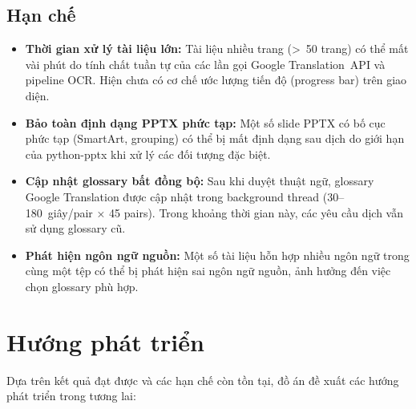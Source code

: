 \subsection{Hạn chế}

\begin{itemize}
  \item \textbf{Thời gian xử lý tài liệu lớn:} Tài liệu nhiều trang (>~50 trang) có thể mất
    vài phút do tính chất tuần tự của các lần gọi Google Translation~API và pipeline OCR.
    Hiện chưa có cơ chế ước lượng tiến độ (progress bar) trên giao diện.

  \item \textbf{Bảo toàn định dạng PPTX phức tạp:} Một số slide PPTX có bố cục phức tạp
    (SmartArt, grouping) có thể bị mất định dạng sau dịch do giới hạn của python-pptx khi
    xử lý các đối tượng đặc biệt.

  \item \textbf{Cập nhật glossary bất đồng bộ:} Sau khi duyệt thuật ngữ, glossary Google
    Translation được cập nhật trong background thread (30--180~giây/pair × 45 pairs). Trong
    khoảng thời gian này, các yêu cầu dịch vẫn sử dụng glossary cũ.

  \item \textbf{Phát hiện ngôn ngữ nguồn:} Một số tài liệu hỗn hợp nhiều ngôn ngữ trong cùng
    một tệp có thể bị phát hiện sai ngôn ngữ nguồn, ảnh hưởng đến việc chọn glossary phù hợp.
\end{itemize}

\section{Hướng phát triển}

Dựa trên kết quả đạt được và các hạn chế còn tồn tại, đồ án đề xuất các hướng phát triển trong
tương lai:

